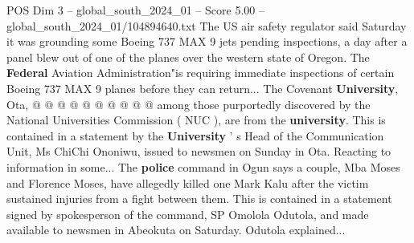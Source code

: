\begin{textsample}{POS Dim 3 – global\_south\_2024\_01 – Score 5.00 – global\_south\_2024\_01/104894640.txt}
The US air safety regulator said Saturday it was grounding some Boeing 737 MAX 9 jets pending inspections, a day after a panel blew out of one of the planes over the western state of Oregon.
The \textbf{Federal} Aviation Administration"is requiring immediate inspections of certain Boeing 737 MAX 9 planes before they can return...
The Covenant \textbf{University}, Ota, @ @ @ @ @ @ @ @ @ @ among those purportedly discovered by the National Universities Commission ( NUC ), are from the \textbf{university}.
This is contained in a statement by the \textbf{University} ' s Head of the Communication Unit, Ms ChiChi Ononiwu, issued to newsmen on Sunday in Ota.
Reacting to information in some...
The \textbf{police} command in Ogun says a couple, Mba Moses and Florence Moses, have allegedly killed one Mark Kalu after the victim sustained injuries from a fight between them.
This is contained in a statement signed by spokesperson of the command, SP Omolola Odutola, and made available to newsmen in Abeokuta on Saturday.
Odutola explained...

\end{textsample}
